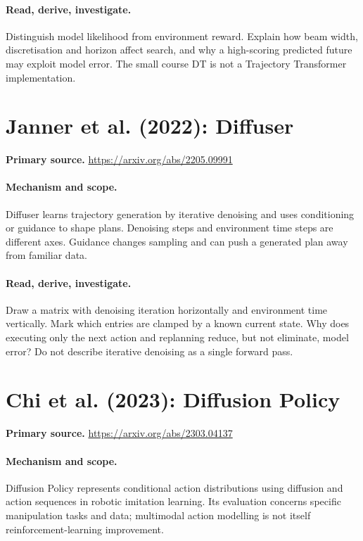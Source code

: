 \documentclass[11pt]{scrartcl}
\begin{document}
\paragraph{Read, derive, investigate.} Distinguish model likelihood from environment reward. Explain how beam width, discretisation and horizon affect search, and why a high-scoring predicted future may exploit model error. The small course DT is not a Trajectory Transformer implementation.

\section{Janner et al. (2022): Diffuser}
\noindent\textbf{Primary source.} \url{https://arxiv.org/abs/2205.09991}

\paragraph{Mechanism and scope.} Diffuser learns trajectory generation by iterative denoising and uses conditioning or guidance to shape plans. Denoising steps and environment time steps are different axes. Guidance changes sampling and can push a generated plan away from familiar data.

\paragraph{Read, derive, investigate.} Draw a matrix with denoising iteration horizontally and environment time vertically. Mark which entries are clamped by a known current state. Why does executing only the next action and replanning reduce, but not eliminate, model error? Do not describe iterative denoising as a single forward pass.

\section{Chi et al. (2023): Diffusion Policy}
\noindent\textbf{Primary source.} \url{https://arxiv.org/abs/2303.04137}

\paragraph{Mechanism and scope.} Diffusion Policy represents conditional action distributions using diffusion and action sequences in robotic imitation learning. Its evaluation concerns specific manipulation tasks and data; multimodal action modelling is not itself reinforcement-learning improvement.
\end{document}
